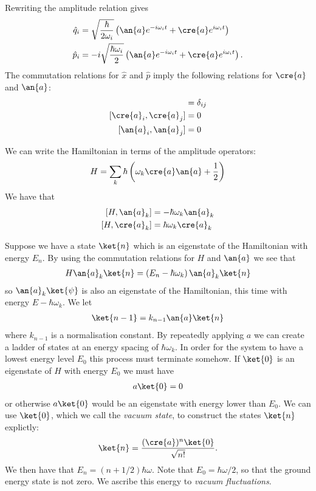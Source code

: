 Rewriting the amplitude relation gives
\begin{align}
  \hat{q}_i &= \sqrt{\frac{\hbar}{2\omega_i}}\left( \an{a}e^{-i\omega_i t} + \cre{a}e^{i\omega_i t}\right) \\
  \hat{p}_i &= -i \sqrt{\frac{\hbar\omega_i}{2}}\left( \an{a}e^{-i\omega_i t} + \cre{a}e^{i\omega_i t}\right).
\end{align}
The commutation relations for $\hat{x}$ and $\hat{p}$ imply the following relations for $\cre{a}$ and $\an{a}$:
\begin{align}
  [\cre{a}_i, \an{a}_j] &= \delta_{ij} \\
  [\cre{a}_i, \cre{a}_j] &= 0 \\
  [\an{a}_i, \an{a}_j] &= 0
\end{align}

We can write the Hamiltonian in terms of the amplitude operators:
\begin{align}
  H = \sum_k \hbar \left( \omega_k \cre{a}\an{a} +\frac{1}{2} \right)
\end{align}
We have that
\begin{align}
  \left[H, \an{a}_k\right] &= -\hbar \omega_k \an{a}_k\\
  \left[H, \cre{a}_k\right] &= \hbar \omega_k \cre{a}_k
\end{align}

Suppose we have a state $\ket{n}$ which is an eigenstate of the Hamiltonian with energy $E_n$. By using the commutation relations for $H$ and $\an{a}$ we see that
\begin{align}
  H\an{a}_k\ket{n} = \left(E_n - \hbar \omega_k\right) \an{a}_k\ket{n}
\end{align}
so $\an{a}_k\ket{\psi}$ is also an eigenstate of the Hamiltonian, this time with energy $E - \hbar\omega_k$. We let 
\begin{align}
  \ket{n-1} = k_{n-1}\an{a} \ket{n}
\end{align}
where $k_{n-1}$ is a normalisation constant. By repeatedly applying $a$ we can create a ladder of states at an energy spacing of $\hbar\omega_k$. In order for the system to have a lowest energy level $E_0$ this process must terminate somehow. If $\ket{0}$ is an eigenstate of $H$ with energy $E_0$ we must have
\begin{align}
  a\ket{0} = 0
\end{align}
or otherwise $a\ket{0}$ would be an eigenstate with energy lower than $E_0$. We can use $\ket{0}$, which we call the \textit{vacuum state}, to construct the states $\ket{n}$ explictly:
\begin{align}
  \ket{n} = \frac{(\cre{a})^n \ket{0}}{\sqrt{n!}}. 
\end{align}
We then have that $E_n = (n+1/2)\hbar\omega$. Note that $E_0 =\hbar \omega/2$, so that the ground energy state is not zero. We ascribe this energy to \textit{vacuum fluctuations}.

